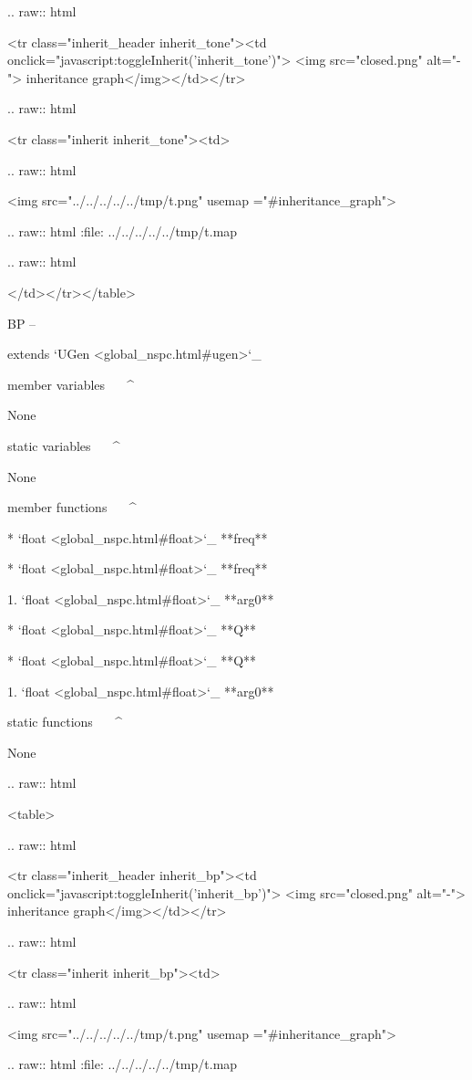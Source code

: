   .. raw:: html

   <tr class="inherit_header inherit_tone"><td onclick="javascript:toggleInherit('inherit_tone')"> <img src="closed.png" alt="-"> inheritance graph</img></td></tr>


  .. raw:: html

   <tr class="inherit inherit_tone"><td>


  .. raw:: html

   <img src="../../../../../tmp/t.png" usemap ="#inheritance_graph">


  .. raw:: html
   :file:   ../../../../../tmp/t.map


  .. raw:: html

   </td></tr></table>

BP
--

extends `UGen <global_nspc.html#ugen>`_ 

member variables
^^^^^^^^^^^^^^^^

	None

static variables
^^^^^^^^^^^^^^^^

	None

member functions
^^^^^^^^^^^^^^^^

	* `float <global_nspc.html#float>`_ **freq**

	* `float <global_nspc.html#float>`_ **freq**

		1. `float <global_nspc.html#float>`_ **arg0**

	* `float <global_nspc.html#float>`_ **Q**

	* `float <global_nspc.html#float>`_ **Q**

		1. `float <global_nspc.html#float>`_ **arg0**

static functions
^^^^^^^^^^^^^^^^


	None


  .. raw:: html

   <table>


  .. raw:: html

   <tr class="inherit_header inherit_bp"><td onclick="javascript:toggleInherit('inherit_bp')"> <img src="closed.png" alt="-"> inheritance graph</img></td></tr>


  .. raw:: html

   <tr class="inherit inherit_bp"><td>


  .. raw:: html

   <img src="../../../../../tmp/t.png" usemap ="#inheritance_graph">


  .. raw:: html
   :file:   ../../../../../tmp/t.map


